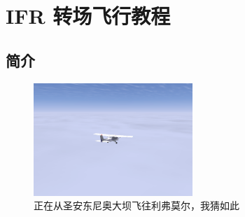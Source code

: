 

%
%
%
%
%
%
%







\ifchinese
\chapter{{\\}IFR 转场飞行教程}
\label{IFR Tutorial}

\section{简介}

\begin{figure}[h]
  \begin{center}
    \includegraphics[width=6cm]{img/somewhere}
    \caption{正在从圣安东尼奥大坝飞往利弗莫尔，我猜如此}
    \label{fig:somewhere}
  \end{center}
\end{figure}

